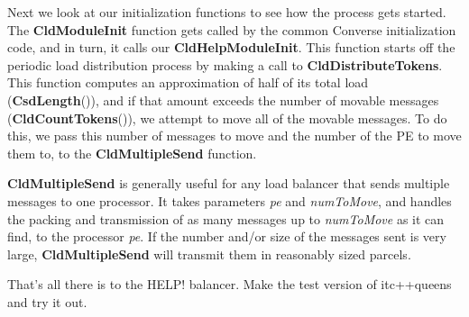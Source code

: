 \documentclass[11pt]{article}
\begin{document}
Next we look at our initialization functions to see how the process gets
started.  The {\bf CldModuleInit} function gets called by the common Converse
initialization code, and in turn, it calls our {\bf CldHelpModuleInit}.  This
function starts off the periodic load distribution process by making a call to
{\bf CldDistributeTokens}.  This function computes an approximation of half of
its total load ({\bf CsdLength}()), and if that amount exceeds the number of
movable messages ({\bf CldCountTokens}()), we attempt to move all of the
movable messages.  To do this, we pass this number of messages to move and the
number of the PE to move them to, to the {\bf CldMultipleSend} function.

{\bf CldMultipleSend} is generally useful for any load balancer that sends
multiple messages to one processor.  It takes parameters {\sl pe} and {\sl
numToMove}, and handles the packing and transmission of as many messages up to
{\sl numToMove} as it can find, to the processor {\sl pe}.  If the number
and/or size of the messages sent is very large, {\bf CldMultipleSend} will
transmit them in reasonably sized parcels.

That's all there is to the HELP! balancer.  Make the test version of
itc++queens and try it out.
\end{document}
